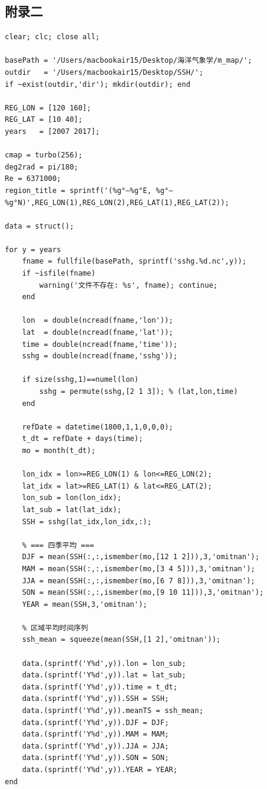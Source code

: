 \documentclass[UTF8]{article}
\begin{document}
\subsection*{附录二}
\begin{verbatim}
clear; clc; close all;

basePath = '/Users/macbookair15/Desktop/海洋气象学/m_map/';
outdir   = '/Users/macbookair15/Desktop/SSH/';
if ~exist(outdir,'dir'); mkdir(outdir); end

REG_LON = [120 160];
REG_LAT = [10 40];
years   = [2007 2017];

cmap = turbo(256);
deg2rad = pi/180;
Re = 6371000;
region_title = sprintf('(%g°–%g°E, %g°–%g°N)',REG_LON(1),REG_LON(2),REG_LAT(1),REG_LAT(2));

data = struct();

for y = years
    fname = fullfile(basePath, sprintf('sshg.%d.nc',y));
    if ~isfile(fname)
        warning('文件不存在: %s', fname); continue;
    end

    lon  = double(ncread(fname,'lon'));
    lat  = double(ncread(fname,'lat'));
    time = double(ncread(fname,'time'));
    sshg = double(ncread(fname,'sshg'));

    if size(sshg,1)==numel(lon)
        sshg = permute(sshg,[2 1 3]); % (lat,lon,time)
    end

    refDate = datetime(1800,1,1,0,0,0);
    t_dt = refDate + days(time);
    mo = month(t_dt);

    lon_idx = lon>=REG_LON(1) & lon<=REG_LON(2);
    lat_idx = lat>=REG_LAT(1) & lat<=REG_LAT(2);
    lon_sub = lon(lon_idx);
    lat_sub = lat(lat_idx);
    SSH = sshg(lat_idx,lon_idx,:);

    % === 四季平均 ===
    DJF = mean(SSH(:,:,ismember(mo,[12 1 2])),3,'omitnan');
    MAM = mean(SSH(:,:,ismember(mo,[3 4 5])),3,'omitnan');
    JJA = mean(SSH(:,:,ismember(mo,[6 7 8])),3,'omitnan');
    SON = mean(SSH(:,:,ismember(mo,[9 10 11])),3,'omitnan');
    YEAR = mean(SSH,3,'omitnan');

    % 区域平均时间序列
    ssh_mean = squeeze(mean(SSH,[1 2],'omitnan'));

    data.(sprintf('Y%d',y)).lon = lon_sub;
    data.(sprintf('Y%d',y)).lat = lat_sub;
    data.(sprintf('Y%d',y)).time = t_dt;
    data.(sprintf('Y%d',y)).SSH = SSH;
    data.(sprintf('Y%d',y)).meanTS = ssh_mean;
    data.(sprintf('Y%d',y)).DJF = DJF;
    data.(sprintf('Y%d',y)).MAM = MAM;
    data.(sprintf('Y%d',y)).JJA = JJA;
    data.(sprintf('Y%d',y)).SON = SON;
    data.(sprintf('Y%d',y)).YEAR = YEAR;
end


\end{verbatim}
\end{document}
